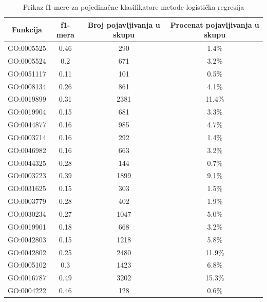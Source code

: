 \begin{table}[h]
	\centering
	\begin{tabular}{|c|c|c|c|}
		\hline
		Funkcija & f1-mera & Broj pojavljivanja u skupu & Procenat pojavljivanja u skupu \\		\hline
		GO:0005525 & 0.46 & 290 & 1.4\% \\
		\hline
		GO:0005524 & 0.2 & 671 & 3.2\% \\
		\hline
		GO:0051117 & 0.11 & 101 & 0.5\% \\
		\hline
		GO:0008134 & 0.26 & 861 & 4.1\% \\
		\hline
		GO:0019899 & 0.31 & 2381 & 11.4\% \\
		\hline
		GO:0019904 & 0.15 & 681 & 3.3\% \\
		\hline
		GO:0044877 & 0.16 & 985 & 4.7\% \\
		\hline
		GO:0003714 & 0.16 & 292 & 1.4\% \\
		\hline
		GO:0046982 & 0.16 & 663 & 3.2\% \\
		\hline
		GO:0044325 & 0.28 & 144 & 0.7\% \\
		\hline
		GO:0003723 & 0.39 & 1899 & 9.1\% \\
		\hline
		GO:0031625 & 0.15 & 303 & 1.5\% \\
		\hline
		GO:0003779 & 0.28 & 402 & 1.9\% \\
		\hline
		GO:0030234 & 0.27 & 1047 & 5.0\% \\
		\hline
		GO:0019901 & 0.18 & 668 & 3.2\% \\
		\hline
		GO:0042803 & 0.15 & 1218 & 5.8\% \\
		\hline
		GO:0042802 & 0.25 & 2480 & 11.9\% \\
		\hline
		GO:0005102 & 0.3 & 1423 & 6.8\% \\
		\hline
		GO:0016787 & 0.49 & 3202 & 15.3\% \\
		\hline
		GO:0004222 & 0.46 & 128 & 0.6\% \\
		\hline
	\end{tabular}
	\caption{Prikaz f1-mere za pojedina\v cne klasifikatore metode logistička regresija}
	\label{tab: lrF1}
\end{table}

